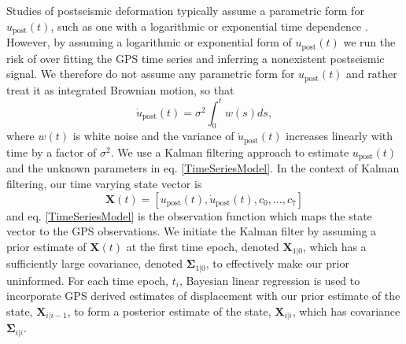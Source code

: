 \documentclass[1p]{elsarticle}
\begin{document}
Studies of postseismic deformation typically assume a parametric form for $u_\mathrm{post}(t)$, such as one with a logarithmic or exponential time dependence \citep[e.g.][]{Savage2005a}.  However, by assuming a logarithmic or exponential form of $u_\mathrm{post}(t)$ we run the risk of over fitting the GPS time series and inferring a nonexistent postseismic signal. We therefore do not assume any parametric form for $u_\mathrm{post}(t)$ and rather treat it as integrated Brownian motion, so that 
\begin{equation}
    \dot{u}_\mathrm{post}(t) = \sigma^2\int_0^t w(s) ds,
\end{equation}    
where $w(t)$ is white noise and the variance of $\dot{u}_\mathrm{post}(t)$ increases linearly with time by a factor of $\sigma^2$. We use a Kalman filtering approach to estimate $u_\mathrm{post}(t)$ and the unknown parameters in eq. \ref{TimeSeriesModel}.  In the context of Kalman filtering, our time varying state vector is
\begin{equation}
    \mathbf{X}(t) = [u_\mathrm{post}(t),\dot u_\mathrm{post}(t), c_0, ..., c_7]
\end{equation}
and eq. \ref{TimeSeriesModel} is the observation function which maps the state vector to the GPS observations. We initiate the Kalman filter by assuming a prior estimate of $\mathbf{X}(t)$ at the first time epoch, denoted $\mathbf{X}_{1|0}$, which has a sufficiently large covariance, denoted $\mathbf{\Sigma}_{1|0}$, to effectively make our prior uninformed.  For each time epoch, $t_i$, Bayesian linear regression is used to incorporate GPS derived estimates of displacement with our prior estimate of the state, $\mathbf{X}_{i|i-1}$, to form a posterior estimate of the state, $\mathbf{X}_{i|i}$, which has covariance $\mathbf{\Sigma}_{i|i}$.  
\end{document}
